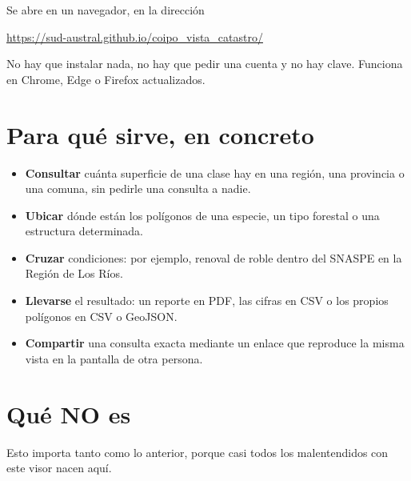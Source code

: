 \documentclass[11pt,a4paper]{report}
\newcommand{\campo}[1]{\textcolor{conaf}{\textbf{#1}}}
\begin{document}
Se abre en un navegador, en la dirección

\begin{center}
\large\url{https://sud-austral.github.io/coipo_vista_catastro/}
\end{center}

No hay que instalar nada, no hay que pedir una cuenta y no hay clave. Funciona
en Chrome, Edge o Firefox actualizados.

\section{Para qué sirve, en concreto}

\begin{itemize}
  \item \campo{Consultar} cuánta superficie de una clase hay en una región, una
        provincia o una comuna, sin pedirle una consulta a nadie.
  \item \campo{Ubicar} dónde están los polígonos de una especie, un tipo
        forestal o una estructura determinada.
  \item \campo{Cruzar} condiciones: por ejemplo, renoval de roble dentro del
        SNASPE en la Región de Los Ríos.
  \item \campo{Llevarse} el resultado: un reporte en PDF, las cifras en CSV o
        los propios polígonos en CSV o GeoJSON.
  \item \campo{Compartir} una consulta exacta mediante un enlace que reproduce
        la misma vista en la pantalla de otra persona.
\end{itemize}

\section{Qué NO es}

Esto importa tanto como lo anterior, porque casi todos los malentendidos con
este visor nacen aquí.
\end{document}
